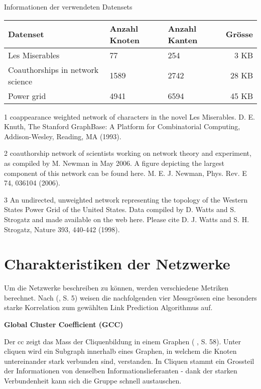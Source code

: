 \begin{threeparttable}
    \centering
    \label{dataset_info}
    \caption{Informationen der verwendeten Datensets}
    \begin{tabular}{@{}lllr@{}}
        \toprule
        Datenset                        & Anzahl Knoten & Anzahl Kanten & Grösse \\ \midrule
        Les Miserables\tnote{1}                 & 77     & 254 & 3 KB   \\
        Coauthorships in network science\tnote{2} & 1589    & 2742 & 28 KB     \\
        Power grid\tnote{3}                       & 4941   & 6594 & 45 KB   \\ \bottomrule
    \end{tabular}
    \begin{tablenotes}[\flushleft]
        \footnotesize
        \item[1] coappearance weighted network of characters in the novel Les Miserables. D. E. Knuth, The Stanford GraphBase: A Platform for Combinatorial Computing, Addison-Wesley, Reading, MA (1993).
        \item[2] coauthorship network of scientists working on network theory and experiment, as compiled by M. Newman in May 2006. A figure depicting the largest component of this network can be found here. M. E. J. Newman, Phys. Rev. E 74, 036104 (2006).
        \item[3] An undirected, unweighted network representing the topology of the Western States Power Grid of the United States. Data compiled by D. Watts and S. Strogatz and made available on the web here. Please cite D. J. Watts and S. H. Strogatz, Nature 393, 440-442 (1998).
    \end{tablenotes}
\end{threeparttable}

\section{Charakteristiken der Netzwerke}
Um die Netzwerke beschreiben zu können, werden verschiedene Metriken berechnet.
Nach \citeauthor{gao_link_2015} (\citeyear{gao_link_2015}, S. 5) weisen die nachfolgenden vier Messgrössen eine besonders starke Korrelation zum gewählten Link Prediction Algorithmus auf.

\textbf{Global Cluster Coefficient (GCC)}

Der \acs{cc} zeigt das Mass der Cliquenbildung in einem Graphen (\citeauthor{michael_henninger_soziale_2018} \citeyear{michael_henninger_soziale_2018}, S. 58).
Unter \acs{clique}n wird ein Subgraph innerhalb eines Graphen, in welchem die Knoten untereinander stark verbunden sind, verstanden.
In Cliquen stammt ein Grossteil der Informationen von denselben Informationslieferanten - dank der starken Verbundenheit kann sich die Gruppe schnell austauschen.

